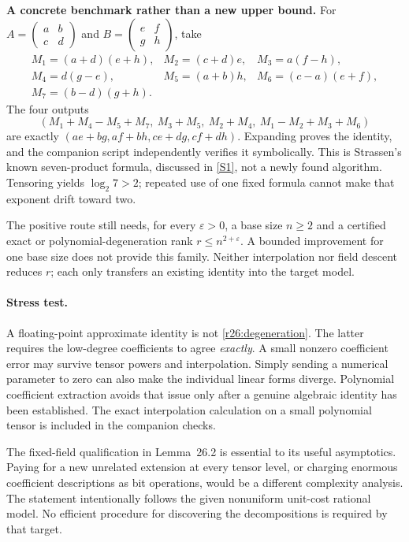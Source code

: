 \documentclass[11pt,a4paper]{article}
\newcommand{\sref}[2]{\hyperlink{source:#1:#2}{[S#2]}}
\numberwithin{equation}{section}
\begin{document}
\medskip
\textbf{A concrete benchmark rather than a new upper bound.}
For
$A=\left(\begin{smallmatrix}a&b\\c&d\end{smallmatrix}\right)$ and
$B=\left(\begin{smallmatrix}e&f\\g&h\end{smallmatrix}\right)$, take
\[
\begin{array}{lll}
 M_1=(a+d)(e+h),&M_2=(c+d)e,&M_3=a(f-h),\\
 M_4=d(g-e),&M_5=(a+b)h,&M_6=(c-a)(e+f),\\
 M_7=(b-d)(g+h).&&
\end{array}
\]
The four outputs
\[
 (M_1+M_4-M_5+M_7,\ M_3+M_5,\ M_2+M_4,\ M_1-M_2+M_3+M_6)
\]
are exactly $(ae+bg,af+bh,ce+dg,cf+dh)$. Expanding proves the identity,
and the companion script independently verifies it symbolically. This
is Strassen's known seven-product formula, discussed in \sref{3100086}{1},
not a newly found algorithm. Tensoring yields $\log_2 7>2$; repeated
use of one fixed formula cannot make that exponent drift toward two.

The positive route still needs, for every $\varepsilon>0$, a base size
$n\ge2$ and a certified exact or polynomial-degeneration rank
$r\le n^{2+\varepsilon}$. A bounded improvement for one base size does
not provide this family. Neither interpolation nor field descent reduces
$r$; each only transfers an existing identity into the target model.

\paragraph{Stress test.}
A floating-point approximate identity is not
\eqref{r26:degeneration}. The latter requires the low-degree coefficients
to agree \emph{exactly}. A small nonzero coefficient error may survive
tensor powers and interpolation. Simply sending a numerical parameter
to zero can also make the individual linear forms diverge. Polynomial
coefficient extraction avoids that issue only after a genuine algebraic
identity has been established. The exact interpolation calculation on
a small polynomial tensor is included in the companion checks.

The fixed-field qualification in Lemma~26.2 is essential to its useful
asymptotics. Paying for a new unrelated extension at every tensor level,
or charging enormous coefficient descriptions as bit operations, would
be a different complexity analysis. The statement intentionally follows
the given nonuniform unit-cost rational model. No efficient procedure
for discovering the decompositions is required by that target.
\end{document}
